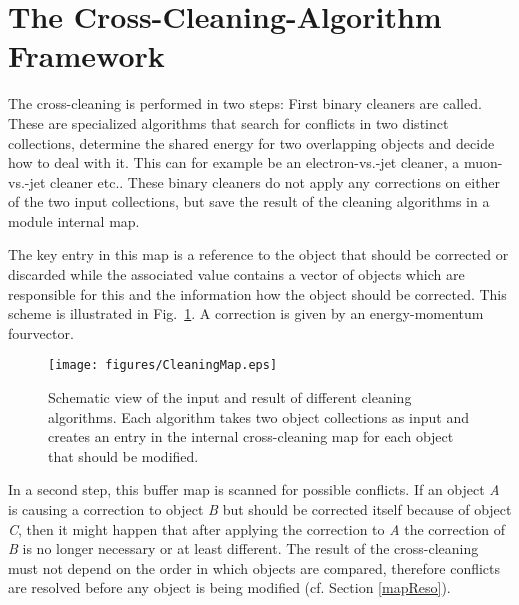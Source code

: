 \documentclass{cmspaper}
\begin{document}

\section{The Cross-Cleaning-Algorithm Framework}
The cross-cleaning is performed in two steps: First binary cleaners are called.
These are specialized algorithms that search for conflicts in two distinct
collections, determine the shared energy for two overlapping objects and decide
how to deal with it. This can for example be an electron-vs.-jet cleaner, a
muon-vs.-jet cleaner etc.. These binary cleaners do not apply any corrections
on either of the two input collections, but save the result of the cleaning
algorithms in a module internal map.

The key entry in this map is a reference to the object that should be corrected
or discarded while the associated value contains a vector of objects which are
responsible for this and the information how the object should be corrected. This
scheme is illustrated in Fig.~\ref{fig:Cleaning}. A correction is given by an
energy-momentum fourvector.

\begin{figure}[hbt]
\begin{center}
\texttt{[image: figures/CleaningMap.eps]}
\caption{Schematic view of the input and result of different cleaning
    algorithms. Each algorithm takes two object collections as input and
    creates an entry in the internal cross-cleaning map for each object
    that should be modified.}
\label{fig:Cleaning}
\end{center}
\end{figure}

In a second step, this buffer map is scanned for possible conflicts.
If an object {\it A} is causing a correction to object {\it B} but should
be corrected itself because of object {\it C}, then it might happen that after
applying the correction to {\it A} the correction of {\it B} is no longer
necessary or at least different.
The result of the cross-cleaning must not depend on the order in which objects
are compared, therefore conflicts are resolved before any object is being
modified (cf. Section \ref{mapReso}).
\end{document}
